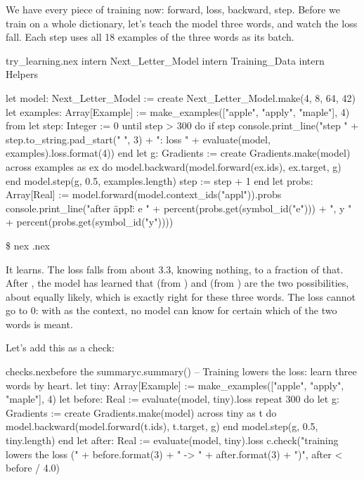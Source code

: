 \documentclass[11pt,a4paper,oneside,openany]{book}
\newcommand{\tryoutput}[1]{%
  \begin{tcolorbox}[outbox]
  {\ttfamily\footnotesize\color{outfg}\$ nex \detokenize{#1}.nex}\par\vspace{2pt}
  
  \end{tcolorbox}}
\newcommand{\code}[1]{\texttt{\detokenize{#1}}}
\begin{document}
We have every piece of training now: forward, loss, backward, step.
Before we train on a whole dictionary, let's teach the model three words,
and watch the loss fall. Each step uses all 18 examples of the three
words as its batch.

\begin{tryit}{try_learning.nex}
intern Next_Letter_Model
intern Training_Data
intern Helpers

let model: Next_Letter_Model := create Next_Letter_Model.make(4, 8, 64, 42)
let examples: Array[Example] := make_examples(["apple", "apply", "maple"], 4)
from
  let step: Integer := 0
until
  step > 300
do
  if step %
    console.print_line("step " + step.to_string.pad_start(" ", 3) + ": loss "
      + evaluate(model, examples).loss.format(4))
  end
  let g: Gradients := create Gradients.make(model)
  across examples as ex do
    model.backward(model.forward(ex.ids), ex.target, g)
  end
  model.step(g, 0.5, examples.length)
  step := step + 1
end
let probs: Array[Real] := model.forward(model.context_ids("appl")).probs
console.print_line("after \"appl\": e " + percent(probs.get(symbol_id("e")))
  + ", y " + percent(probs.get(symbol_id("y"))))
\end{tryit}
\tryoutput{try_learning}

It learns. The loss falls from about 3.3, knowing nothing, to a fraction
of that. After \code{appl}, the model has learned that \code{e} (from
\code{apple}) and \code{y} (from \code{apply}) are the two possibilities,
about equally likely, which is exactly right for these three words. The
loss cannot go to 0: with \code{appl} as the context, no model can know
for certain which of the two words is meant.

Let's add this as a check:

\begin{addbefore}{checks.nex}{before the summary}{c.summary()}
-- Training lowers the loss: learn three words by heart.
let tiny: Array[Example] := make_examples(["apple", "apply", "maple"], 4)
let before: Real := evaluate(model, tiny).loss
repeat 300 do
  let g: Gradients := create Gradients.make(model)
  across tiny as t do
    model.backward(model.forward(t.ids), t.target, g)
  end
  model.step(g, 0.5, tiny.length)
end
let after: Real := evaluate(model, tiny).loss
c.check("training lowers the loss (" + before.format(3) + " -> " + after.format(3) + ")",
  after < before / 4.0)
\end{addbefore}

\end{document}
